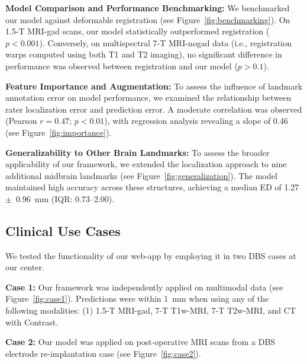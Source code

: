 \textbf{Model Comparison and Performance Benchmarking:} We benchmarked our model against deformable registration (see Figure~\ref{fig:benchmarking}). On 1.5-T MRI-gad scans, our model statistically outperformed registration ($p < 0.001$). Conversely, on multispectral 7-T MRI-nogad data (i.e., registration warps computed using both T1 and T2 imaging), no significant difference in performance was observed between registration and our model ($p > 0.1$).

\textbf{Feature Importance and Augmentation:} To assess the influence of landmark annotation error on model performance, we examined the relationship between rater localization error and prediction error. A moderate correlation was observed (Pearson $r = 0.47$; $p < 0.01$), with regression analysis revealing a slope of 0.46 (see Figure~\ref{fig:importance}).

\textbf{Generalizability to Other Brain Landmarks:} To assess the broader applicability of our framework, we extended the localization approach to nine additional midbrain landmarks (see Figure~\ref{fig:generalization}). The model maintained high accuracy across these structures, achieving a median ED of 1.27~$\pm$~0.96~mm (IQR: 0.73–2.00).

\subsection{Clinical Use Cases}
We tested the functionality of our web-app by employing it in two DBS cases at our center.

\textbf{Case 1:} Our framework was independently applied on multimodal data (see Figure~\ref{fig:case1}). Predictions were within 1~mm when using any of the following modalities: (1) 1.5-T MRI-gad, 7-T T1w-MRI, 7-T T2w-MRI, and CT with Contrast.

\textbf{Case 2:} Our model was applied on post-operative MRI scans from a DBS electrode re-implantation case (see Figure~\ref{fig:case2}).

